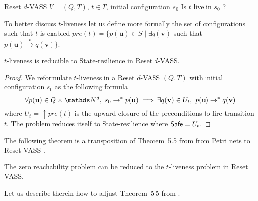 {Reset $d$-VASS $V=(Q,T)$, $t \in T$, initial configuration $s_0$}
{Is $t$ live in $s_0$ ? \\}


To better discuss $t$-liveness let us define more formally the set of configurations such that $t$ is enabled
$pre(t)=\{ p(\textbf{u}) \in S \mid \exists q(\textbf{v})$ such that $ p(\textbf{u}) \xrightarrow{t} q(\textbf{v}) \}$.



\begin{proposition}\label{reductions}
{\sc $t$-liveness} is reducible to {\sc State-resilience} in Reset $d$-VASS.
\end{proposition}


\begin{proof}
We reformulate $t$-liveness 
in a 
Reset $d$-VASS $(Q,T)$ 
with initial configuration $s_0$
as the following formula
\[ ~ \forall p(\textbf{u}) \in Q \times \N^d, 
~ s_0 \rightarrow^* p(\textbf{u}) \implies \exists q(\textbf{v}) \in U_t, ~ p(\textbf{u}) \rightarrow^{*} q(\textbf{v})\]
where
$U_t=\uparrow pre(t)$ 
is the upward closure of the preconditions to fire transition $t$.  
The problem reduces itself to {\sc State-resilience}
where $\textsf{Safe} = U_t$.
\end{proof}


The following theorem is a transposition of Theorem~5.5 from \cite{peterson1981petri} from Petri nets to Reset VASS%
.
\begin{proposition}\label{liveness reset}
The  zero reachability problem can be reduced to the $t$-liveness problem in Reset VASS.
\end{proposition}





Let us describe therein how to adjust Theorem~5.5 from \cite{peterson1981petri}.

